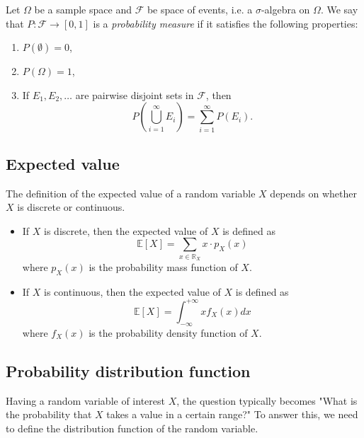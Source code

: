 \begin{definition}
    Let $\Omega$ be a sample space and $\mathcal{F}$ be space of events, i.e. a $\sigma$-algebra on $\Omega$. We say that $P: \mathcal{F} \to [0, 1] $ is a \emph{probability measure} if it satisfies the following properties:
    \begin{enumerate}[label=(\roman*)]
        \item $P(\emptyset) = 0$,
        \item $P(\Omega) = 1$,
        \item If $E_1, E_2, \dots$ are pairwise disjoint sets in $\mathcal{F}$, then
        \[
            P\left(\bigcup_{i=1}^\infty E_i\right) = \sum_{i=1}^\infty P(E_i).
        \]
    \end{enumerate}
\end{definition}

\subsection{Expected value}

\begin{definition}
    The definition of the expected value of a random variable $X$ depends on whether $X$ is discrete or continuous.
    \begin{itemize}
        \item If $X$ is discrete, then the expected value of $X$ is defined as
        \[
            \mathbb{E}[X] = \sum_{x \in \mathbb{R}_X} x \cdot p_X(x)
        \]
        where $p_X(x)$ is the probability mass function of $X$.

        \item If $X$ is continuous, then the expected value of $X$ is defined as
        \[
            \mathbb{E}[X] = \int_{-\infty}^{+\infty} x f_X(x)dx
        \]
        where $f_X(x)$ is the probability density function of $X$.
    \end{itemize}
\end{definition}

\subsection{Probability distribution function}
Having a random variable of interest $X$, the question typically becomes "What is the probability that $X$ takes a value in a certain range?" To answer this, we need to define the distribution function of the random variable.

